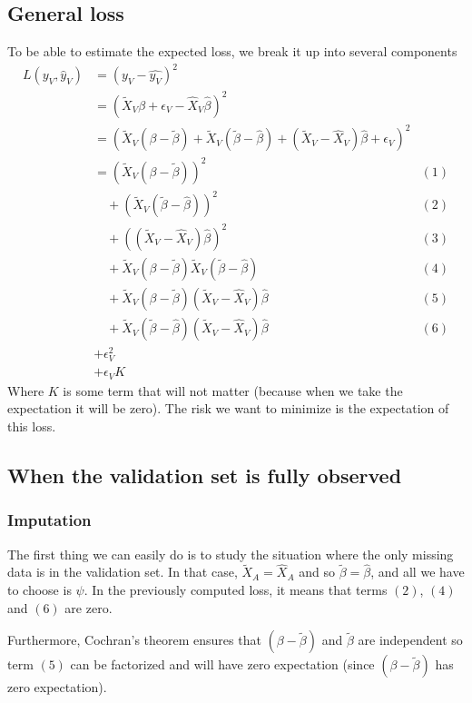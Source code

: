 \documentclass[12pt, a4paper]{memoir}
\begin{document}
		\subsection{General loss}
To be able to estimate the expected loss, we break it up into several components
\begin{align*}
L(y_V, \hat{y}_V) &= (y_V - \hat{y_V})^2 &\\
				   &= (\tilde{X}_V \beta + \epsilon_V - \hat{X}_V \hat{\beta})^2 &\\
				   &= (\tilde{X}_V(\beta - \tilde{\beta}) + \tilde{X}_V (\tilde{\beta} - \hat{\beta}) + (\tilde{X}_V - \hat{X}_V) \hat{\beta} + \epsilon_V)^2 & \\
				   &= (\tilde{X}_V (\beta - \tilde{\beta}))^2 & (1) \\
				   & \quad + (\tilde{X}_V (\tilde{\beta}-\hat{\beta}))^2 &(2) \\
				   & \quad + ((\tilde{X}_V - \hat{X}_V) \hat{\beta})^2 &(3) \\
				   & \quad + \tilde{X}_V (\beta - \tilde{\beta}) \tilde{X}_V (\tilde{\beta} - \hat{\beta}) & (4) \\
				   & \quad + \tilde{X}_V (\beta - \tilde{\beta}) (\tilde{X}_V - \hat{X}_V )\hat{\beta} & (5) \\
				   & \quad + \tilde{X}_V (\tilde{\beta} - \hat{\beta}) (\tilde{X}_V - \hat{X}_V) \hat{\beta} & (6)\\
				   & + \epsilon_V^2 &\\
				   & + \epsilon_V K
\end{align*}
Where $K$ is some term that will not matter (because when we take the expectation it will be zero). The risk we want to minimize is the expectation of this loss.
		\subsection{When the validation set is fully observed}
			\subsubsection{Imputation}
The first thing we can easily do is to study the situation where the only missing data is in the validation set. In that case, $\tilde{X}_A = \hat{X}_A$ and so $\tilde{\beta} = \hat{\beta}$, and all we have to choose is $\psi$. In the previously computed loss, it means that terms $(2)$, $(4)$ and $(6)$ are zero.

Furthermore, Cochran's theorem ensures that $(\beta - \tilde{\beta})$ and $\tilde{\beta}$ are independent so term $(5)$ can be factorized and will have zero expectation (since $(\beta - \tilde{\beta})$ has zero expectation).
\end{document}
